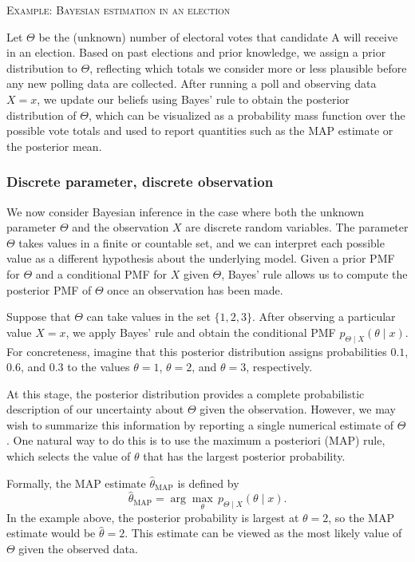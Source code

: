 \bigskip
\textsc{Example: Bayesian estimation in an election}

Let \(\Theta\) be the (unknown) number of electoral votes that candidate A will receive in an election.  
Based on past elections and prior knowledge, we assign a prior distribution to \(\Theta\), reflecting which totals we consider more or less plausible before any new polling data are collected.  
After running a poll and observing data \(X = x\), we update our beliefs using Bayes' rule to obtain the posterior distribution of \(\Theta\), which can be visualized as a probability mass function over the possible vote totals and used to report quantities such as the MAP estimate or the posterior mean.


\subsubsection{Discrete parameter, discrete observation}

We now consider Bayesian inference in the case where both the unknown parameter \(\Theta\) and the observation \(X\) are discrete random variables.  
The parameter \(\Theta\) takes values in a finite or countable set, and we can interpret each possible value as a different hypothesis about the underlying model.  
Given a prior PMF for \(\Theta\) and a conditional PMF for \(X\) given \(\Theta\), Bayes' rule allows us to compute the posterior PMF of \(\Theta\) once an observation has been made.  

Suppose that \(\Theta\) can take values in the set \(\{1,2,3\}\).  
After observing a particular value \(X = x\), we apply Bayes' rule and obtain the conditional PMF \(p_{\Theta \mid X}(\theta \mid x)\).  
For concreteness, imagine that this posterior distribution assigns probabilities \(0.1\), \(0.6\), and \(0.3\) to the values \(\theta = 1\), \(\theta = 2\), and \(\theta = 3\), respectively.  

At this stage, the posterior distribution provides a complete probabilistic description of our uncertainty about \(\Theta\) given the observation.  
However, we may wish to summarize this information by reporting a single numerical estimate of \(\Theta\).  
One natural way to do this is to use the maximum a posteriori (MAP) rule, which selects the value of \(\theta\) that has the largest posterior probability.  

Formally, the MAP estimate \(\hat{\theta}_{\text{MAP}}\) is defined by
\[
\hat{\theta}_{\text{MAP}}
=
\arg\max_{\theta} \, p_{\Theta \mid X}(\theta \mid x).
\]
In the example above, the posterior probability is largest at \(\theta = 2\), so the MAP estimate would be \(\hat{\theta} = 2\).  
This estimate can be viewed as the most likely value of \(\Theta\) given the observed data.  

